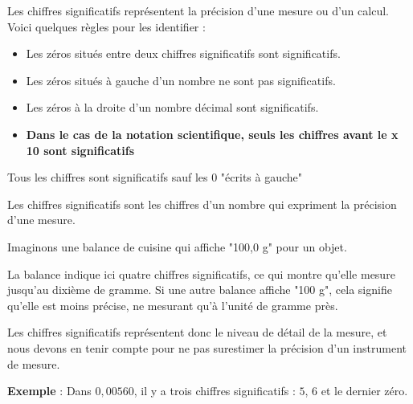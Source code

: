 \documentclass[a4paper,12pt]{article}
\begin{document}
Les chiffres significatifs représentent la précision d'une mesure ou d'un calcul. Voici quelques règles pour les identifier :
\begin{itemize}[noitemsep]
    \item Les zéros situés entre deux chiffres significatifs sont significatifs.
    \item Les zéros situés à gauche d’un nombre ne sont pas significatifs.
    \item Les zéros à la droite d'un nombre décimal sont significatifs.
    \item \textbf{Dans le cas de la notation scientifique, seuls les chiffres avant le x 10 sont significatifs}
\end{itemize}

\begin{tcolorbox}[colback=gray!10!white, colframe=gray!75!black, title=Autrement dit]
  Tous les chiffres sont significatifs sauf les 0 "écrits à gauche"
\end{tcolorbox}

\begin{tcolorbox}[colback=green!10!white, colframe=green!75!black, title=Interprétation]
  Les chiffres significatifs sont les chiffres d'un nombre qui expriment la précision d'une mesure. \\

  \vspace{1em}

  Imaginons une balance de cuisine qui affiche "100,0 g" pour un objet. \\

  \vspace{1em}

  La balance indique ici quatre chiffres significatifs, ce qui montre qu'elle mesure jusqu'au dixième de gramme.
  Si une autre balance affiche "100 g", cela signifie qu'elle est moins précise, ne mesurant qu'à l'unité de gramme près.
  
  \vspace{1em}

  Les chiffres significatifs représentent donc le niveau de détail de la mesure, et nous devons en tenir compte pour ne pas surestimer la précision d'un instrument de mesure.

\end{tcolorbox}

\textbf{Exemple} : Dans $ 0,00560 $, il y a trois chiffres significatifs : $ 5 $, $ 6 $ et le dernier zéro.

\vspace{1em}
\end{document}
